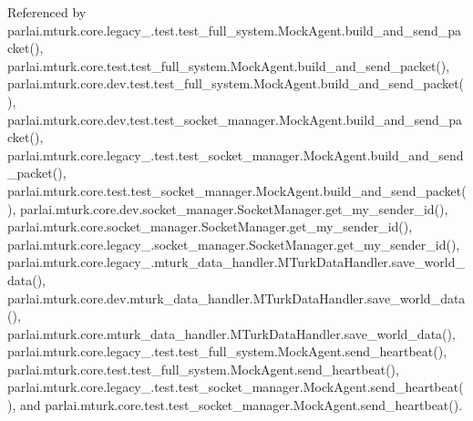 Referenced by parlai.\+mturk.\+core.\+legacy\+\_.\+test.\+test\+\_\+full\+\_\+system.\+Mock\+Agent.\+build\+\_\+and\+\_\+send\+\_\+packet(), parlai.\+mturk.\+core.\+test.\+test\+\_\+full\+\_\+system.\+Mock\+Agent.\+build\+\_\+and\+\_\+send\+\_\+packet(), parlai.\+mturk.\+core.\+dev.\+test.\+test\+\_\+full\+\_\+system.\+Mock\+Agent.\+build\+\_\+and\+\_\+send\+\_\+packet(), parlai.\+mturk.\+core.\+dev.\+test.\+test\+\_\+socket\+\_\+manager.\+Mock\+Agent.\+build\+\_\+and\+\_\+send\+\_\+packet(), parlai.\+mturk.\+core.\+legacy\+\_.\+test.\+test\+\_\+socket\+\_\+manager.\+Mock\+Agent.\+build\+\_\+and\+\_\+send\+\_\+packet(), parlai.\+mturk.\+core.\+test.\+test\+\_\+socket\+\_\+manager.\+Mock\+Agent.\+build\+\_\+and\+\_\+send\+\_\+packet(), parlai.\+mturk.\+core.\+dev.\+socket\+\_\+manager.\+Socket\+Manager.\+get\+\_\+my\+\_\+sender\+\_\+id(), parlai.\+mturk.\+core.\+socket\+\_\+manager.\+Socket\+Manager.\+get\+\_\+my\+\_\+sender\+\_\+id(), parlai.\+mturk.\+core.\+legacy\+\_.\+socket\+\_\+manager.\+Socket\+Manager.\+get\+\_\+my\+\_\+sender\+\_\+id(), parlai.\+mturk.\+core.\+legacy\+\_.\+mturk\+\_\+data\+\_\+handler.\+M\+Turk\+Data\+Handler.\+save\+\_\+world\+\_\+data(), parlai.\+mturk.\+core.\+dev.\+mturk\+\_\+data\+\_\+handler.\+M\+Turk\+Data\+Handler.\+save\+\_\+world\+\_\+data(), parlai.\+mturk.\+core.\+mturk\+\_\+data\+\_\+handler.\+M\+Turk\+Data\+Handler.\+save\+\_\+world\+\_\+data(), parlai.\+mturk.\+core.\+legacy\+\_.\+test.\+test\+\_\+full\+\_\+system.\+Mock\+Agent.\+send\+\_\+heartbeat(), parlai.\+mturk.\+core.\+test.\+test\+\_\+full\+\_\+system.\+Mock\+Agent.\+send\+\_\+heartbeat(), parlai.\+mturk.\+core.\+legacy\+\_.\+test.\+test\+\_\+socket\+\_\+manager.\+Mock\+Agent.\+send\+\_\+heartbeat(), and parlai.\+mturk.\+core.\+test.\+test\+\_\+socket\+\_\+manager.\+Mock\+Agent.\+send\+\_\+heartbeat().

\mbox{\label{classparlai_1_1messenger_1_1core_1_1messenger__manager_1_1MessengerManager_a6a69872a10837de73c265c18374d53d3}} 
